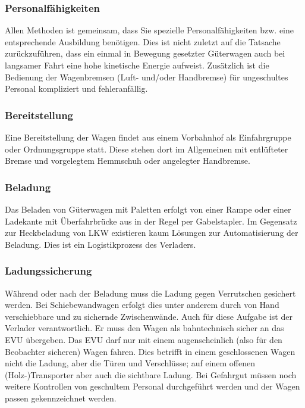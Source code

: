 \subsubsection{Personalfähigkeiten}\label{sec:Personal}
Allen Methoden ist gemeinsam, dass Sie spezielle Personalfähigkeiten bzw. eine entsprechende Ausbildung benötigen. Dies ist nicht zuletzt auf die Tatsache zurückzuführen, dass ein einmal in Bewegung gesetzter Güterwagen auch bei langsamer Fahrt eine hohe kinetische Energie aufweist. Zusätzlich ist die Bedienung der Wagenbremsen (Luft- und/oder Handbremse) für ungeschultes Personal kompliziert und fehleranfällig.
\subsubsection{Bereitstellung}
Eine Bereitstellung der Wagen findet aus einem Vorbahnhof als Einfahrgruppe oder Ordnungsgruppe statt. Diese stehen dort im Allgemeinen mit entlüfteter Bremse und vorgelegtem Hemmschuh oder angelegter Handbremse.
\subsubsection{Beladung}
Das Beladen von Güterwagen mit Paletten erfolgt von einer Rampe oder einer Ladekante mit Überfahrbrücke aus in der Regel per Gabelstapler. Im Gegensatz zur Heckbeladung von LKW existieren kaum Lösungen zur Automatisierung der Beladung. Dies ist ein Logistikprozess des Verladers.
\subsubsection{Ladungssicherung}
Während oder nach der Beladung muss die Ladung gegen Verrutschen gesichert werden. Bei Schiebewandwagen erfolgt dies unter anderem durch von Hand verschiebbare und zu sichernde Zwischenwände. Auch für diese Aufgabe ist der Verlader verantwortlich. Er muss den Wagen als bahntechnisch sicher an das EVU übergeben. Das EVU darf nur mit einem augenscheinlich (also für den Beobachter sicheren) Wagen fahren. Dies betrifft in einem geschlossenen Wagen nicht die Ladung, aber die Türen und Verschlüsse; auf einem offenen (Holz-)Transporter aber auch die sichtbare Ladung. Bei Gefahrgut müssen noch weitere Kontrollen von geschultem Personal durchgeführt werden und der Wagen passen gekennzeichnet werden.
